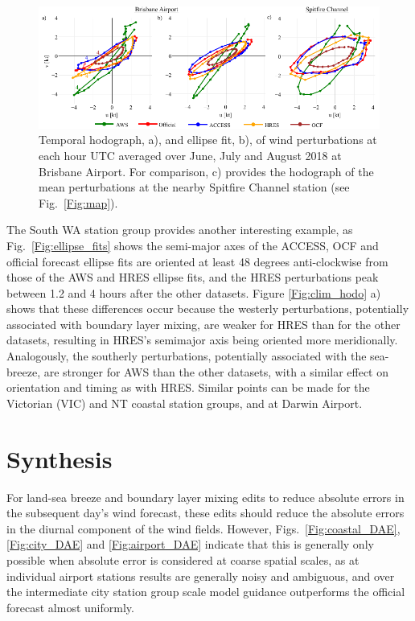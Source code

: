 \documentclass{ametsoc}
\begin{document}
\begin{figure}
\centering
\includegraphics[width=39pc]{ellipse_hodo.pdf}
\caption{Temporal hodograph, a), and ellipse fit, b), of wind perturbations at each hour UTC averaged over June, July and August 2018 at Brisbane Airport. For comparison, c) provides the hodograph of the mean perturbations at the nearby Spitfire Channel station (see Fig.~\ref{Fig:map}).}
\label{Fig:ellipse_hodo}
\end{figure}

The South WA station group provides another interesting example, as Fig.~\ref{Fig:ellipse_fits} shows the semi-major axes of the ACCESS, OCF and official forecast ellipse fits are oriented at least 48 degrees anti-clockwise from those of the AWS and HRES ellipse fits, and the HRES perturbations peak between 1.2 and 4 hours after the other datasets. Figure \ref{Fig:clim_hodo} a) shows that these differences occur because the westerly perturbations, potentially associated with boundary layer mixing, are weaker for HRES than for the other datasets, resulting in HRES's semimajor axis being oriented more meridionally. Analogously, the southerly perturbations, potentially associated with the sea-breeze, are stronger for AWS  than the other datasets, with a similar effect on orientation and timing as with HRES. Similar points can be made for the Victorian (VIC) and NT coastal station groups, and at Darwin Airport.

\section{Synthesis}
\label{Sec:Discussion}
For land-sea breeze and boundary layer mixing edits to reduce absolute errors in the subsequent day's wind forecast, these edits should reduce the absolute errors in the diurnal component of the wind fields. However, Figs.~\ref{Fig:coastal_DAE},\ref{Fig:city_DAE} and \ref{Fig:airport_DAE} indicate that this is generally only possible when absolute error is considered at coarse spatial scales, as at individual airport stations results are generally noisy and ambiguous, and over the intermediate city station group scale model guidance outperforms the official forecast almost uniformly.
\end{document}
